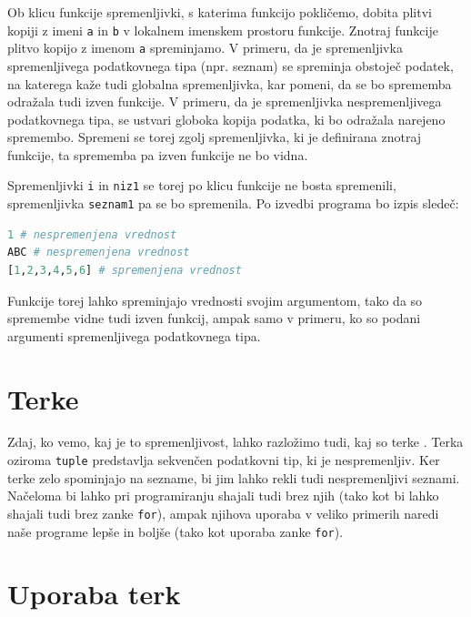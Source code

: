 \begin{resitev}
Ob klicu funkcije spremenljivki, s katerima funkcijo pokličemo, dobita plitvi kopiji z imeni \texttt{a} in \texttt{b} v lokalnem imenskem prostoru funkcije. Znotraj funkcije plitvo kopijo z imenom \texttt{a} spreminjamo. V primeru, da je spremenljivka spremenljivega podatkovnega tipa (npr. seznam) se spreminja obstoječ podatek, na katerega kaže tudi globalna spremenljivka, kar pomeni, da se bo sprememba odražala tudi izven funkcije. V primeru, da je spremenljivka nespremenljivega podatkovnega tipa, se ustvari globoka kopija podatka, ki bo odražala narejeno spremembo. Spremeni se torej zgolj spremenljivka, ki je definirana znotraj funkcije, ta sprememba pa izven funkcije ne bo vidna. 

Spremenljivki \texttt{i} in \texttt{niz1} se torej po klicu funkcije ne bosta spremenili, spremenljivka \texttt{seznam1} pa se bo spremenila. Po izvedbi programa bo izpis sledeč:

\begin{lstlisting}[language=Python]
1 # nespremenjena vrednost
ABC # nespremenjena vrednost
[1,2,3,4,5,6] # spremenjena vrednost
\end{lstlisting}

\end{resitev}

Funkcije torej lahko spreminjajo vrednosti svojim argumentom, tako da so spremembe vidne tudi izven funkcij, ampak samo v primeru, ko so podani argumenti spremenljivega podatkovnega tipa. 



\section{Terke}

Zdaj, ko vemo, kaj je to spremenljivost, lahko razložimo tudi, kaj so terke . Terka oziroma \texttt{tuple} predstavlja sekvenčen podatkovni tip, ki je nespremenljiv. Ker terke zelo spominjajo na sezname, bi jim lahko rekli tudi nespremenljivi seznami. Načeloma bi lahko pri programiranju shajali tudi brez njih (tako kot bi lahko shajali tudi brez zanke \texttt{for}), ampak njihova uporaba v veliko primerih naredi naše programe lepše in boljše (tako kot uporaba zanke \texttt{for}).

\section{Uporaba terk}

